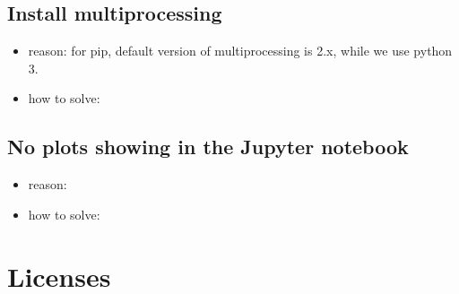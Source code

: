 \documentclass[letterpaper,10pt,english]{sphinxmanual}
\begin{document}
\subsection{Install multiprocessing}
\label{\detokenize{faq:install-multiprocessing}}\begin{itemize}
\item {} 
reason: for pip, default version of multiprocessing is 2.x, while we use python 3.

\item {} 
how to solve:

\begin{sphinxVerbatim}[commandchars=\\\{\}]
  
\end{sphinxVerbatim}

\end{itemize}


\subsection{No plots showing in the Jupyter notebook}
\label{\detokenize{faq:no-plots-showing-in-the-jupyter-notebook}}\begin{itemize}
\item {} 
reason: 

\item {} 
how to solve:

\begin{sphinxVerbatim}[commandchars=\\\{\}]
 

\end{sphinxVerbatim}

\end{itemize}


\section{Licenses}
\label{\detokenize{license:licenses}}\label{\detokenize{license::doc}}
\end{document}
